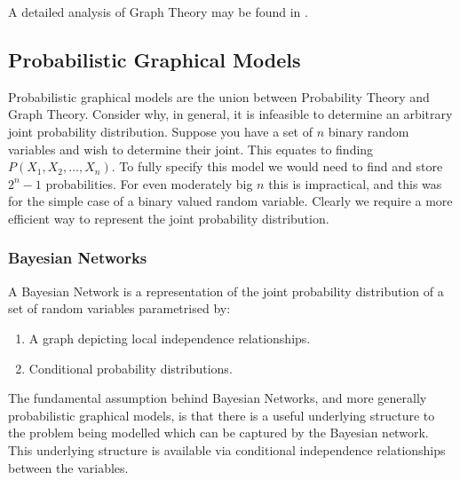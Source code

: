 A detailed analysis of Graph Theory may be found in \cite{deo}.

\subsection{Probabilistic Graphical Models}
\label{sec_graphical_models_theory}
Probabilistic graphical models are the union between Probability Theory and Graph Theory. Consider why, in general, it is infeasible to determine an arbitrary joint probability distribution. Suppose you have a set of $n$ binary random variables and wish to determine their joint. This equates to finding $P(X_1,X_2,...,X_n)$. To fully specify this model we would need to find and store $2^n-1$ probabilities. For even moderately big $n$ this is impractical, and this was for the simple case of a binary valued random variable. Clearly we require a more efficient way to represent the joint probability distribution.

\subsubsection{Bayesian Networks}
A Bayesian Network is a representation of the joint probability distribution of a set of random variables parametrised by:
\begin{enumerate}
\item
A graph depicting local independence relationships.
\item
Conditional probability distributions.
\end{enumerate}  
The fundamental assumption behind Bayesian Networks, and more generally probabilistic graphical models, is that there is a useful underlying structure to the problem being modelled which can be captured by the Bayesian network. This underlying structure is available via conditional independence relationships between the variables.

